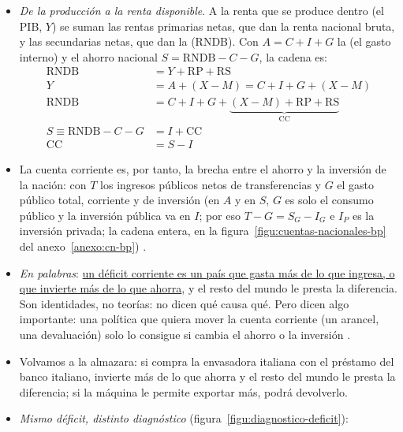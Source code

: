 \documentclass[11pt]{article}
\begin{document}
\begin{itemize}
\item \emph{De la producción a la renta disponible}. A la renta que se produce dentro (el PIB, $Y$) se suman las rentas primarias netas, que dan la renta nacional bruta, y las secundarias netas, que dan la  (RNDB). Con $A=C+I+G$ la  (el gasto interno) y el ahorro nacional $S=\mathrm{RNDB}-C-G$, la cadena es:
\begin{align}
\mathrm{RNDB}&=Y+\mathrm{RP}+\mathrm{RS}\label{eq:rndb}\\
Y&=A+(X-M)=C+I+G+(X-M)\nonumber\\
\mathrm{RNDB}&=C+I+G+\underbrace{(X-M)+\mathrm{RP}+\mathrm{RS}}_{\mathrm{CC}}\nonumber\\
S\equiv\mathrm{RNDB}-C-G&=I+\mathrm{CC}\nonumber\\
\mathrm{CC}&=S-I\nonumber
\end{align}
\item La cuenta corriente es, por tanto, la brecha entre el ahorro y la inversión de la nación:
con $T$ los ingresos públicos netos de transferencias y $G$ el gasto público total, corriente y de inversión (en $A$ y en $S$, $G$ es solo el consumo público y la inversión pública va en $I$; por eso $T-G=S_G-I_G$ e $I_P$ es la inversión privada; la cadena entera, en la figura~\ref{figu:cuentas-nacionales-bp} del anexo~\ref{anexo:cn-bp}) .
\item \emph{En palabras}: \uline{un déficit corriente es un país que gasta más de lo que ingresa, o que invierte más de lo que ahorra}, y el resto del mundo le presta la diferencia. Son identidades, no teorías: no dicen qué causa qué. Pero dicen algo importante: una política que quiera mover la cuenta corriente (un arancel, una devaluación) solo lo consigue si cambia el ahorro o la inversión .
\item Volvamos a la almazara: si compra la envasadora italiana con el préstamo del banco italiano, invierte más de lo que ahorra y el resto del mundo le presta la diferencia; si la máquina le permite exportar más, podrá devolverlo.
\item \emph{Mismo déficit, distinto diagnóstico} (figura~\ref{figu:diagnostico-deficit}):

\end{itemize}
\end{document}
